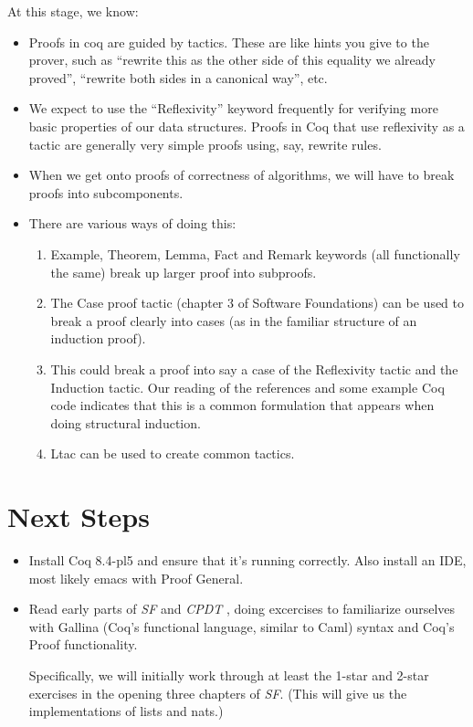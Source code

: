 \documentclass{article}
\begin{document}
At this stage, we know:
\begin{itemize}
\item Proofs in coq are guided by tactics. These are like hints you
  give to the prover, such as ``rewrite this as the other side of this
  equality we already proved'', ``rewrite both sides in a canonical
  way'',  etc.
\item We expect to use the ``Reflexivity'' keyword frequently for
  verifying more
  basic properties of our data structures.
  Proofs in Coq that use reflexivity as a tactic are generally very
  simple proofs using, say, rewrite rules.
\item When we get onto proofs of correctness of algorithms, we will
  have to break proofs into subcomponents.
\item There are various ways of doing this:
\begin{enumerate}
\item Example, Theorem, Lemma, Fact and Remark keywords (all
  functionally the same) break up larger proof into subproofs.
\item The Case proof tactic (chapter 3 of Software Foundations) can be
  used to break a proof clearly into cases (as in the familiar
  structure of an induction proof).
\item This could break a proof into say a case of the Reflexivity
  tactic and the Induction tactic.
  Our reading of the references and some example Coq code
  indicates that this is a common formulation that appears
  when doing structural induction.
\item Ltac can be used to create common tactics.
\end{enumerate}

\end{itemize}

\section{Next Steps}
\begin{itemize}
  \item
    Install Coq 8.4-pl5 and ensure that it's running correctly.
    Also install an IDE, most likely emacs with Proof General.
  \item
    Read early parts of \emph{SF} \cite{sf} and \emph{CPDT} \cite{cpdt},
    doing excercises to familiarize ourselves with Gallina (Coq's functional
    language, similar to Caml) syntax and Coq's Proof functionality.

    Specifically, we will initially work through at least the 1-star and
    2-star exercises in the opening three chapters of \emph{SF}.
    (This will give us the implementations of lists and nats.)
\end{itemize}
\end{document}

